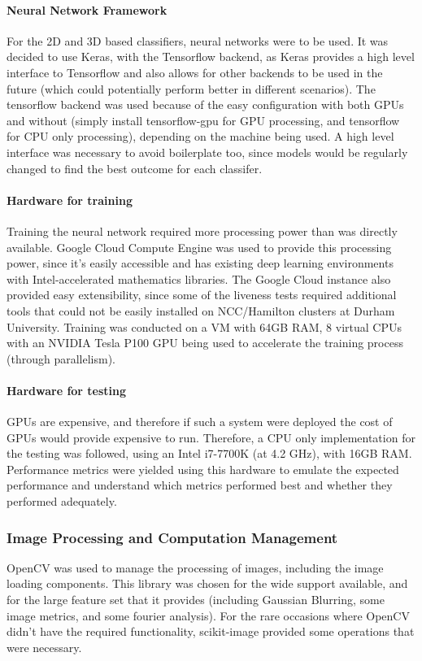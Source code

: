 \documentclass[10pt,a4paper]{article}
\begin{document}
            \paragraph{Neural Network Framework} 
            For the 2D and 3D based classifiers, neural networks were to be used. It was decided to use Keras, with the Tensorflow backend, as Keras provides a high level interface to Tensorflow
            and also allows for other backends to be used in the future (which could potentially perform better in different scenarios). The tensorflow backend was used because of the easy configuration
            with both GPUs and without (simply install tensorflow-gpu for GPU processing, and tensorflow for CPU only processing), depending on the machine being used. A high level interface was necessary
            to avoid boilerplate too, since models would be regularly changed to find the best outcome for each classifer.

            \paragraph{Hardware for training}
            Training the neural network required more processing power than was directly available. Google Cloud Compute Engine was used to provide this processing power, since it's easily accessible and has existing
            deep learning environments with Intel-accelerated mathematics libraries. The Google Cloud instance also provided easy extensibility, since some of the liveness tests required additional tools that could not be easily installed
            on NCC/Hamilton clusters at Durham University. Training was conducted on a VM with 64GB RAM, 8 virtual CPUs with an NVIDIA Tesla P100 GPU being used to accelerate the training process (through parallelism).

            \paragraph{Hardware for testing}
            GPUs are expensive, and therefore if such a system were deployed the cost of GPUs would provide expensive to run. Therefore, a CPU only implementation for the testing was followed, using an Intel i7-7700K (at 4.2 GHz), with
            16GB RAM. Performance metrics were yielded using this hardware to emulate the expected performance and understand which metrics performed best and whether they performed adequately.

        \subsubsection{Image Processing and Computation Management}
            OpenCV was used to manage the processing of images, including the image loading components. This library was chosen for the wide support available, and for the large feature set that it provides (including Gaussian Blurring, some image metrics, and some fourier analysis).
            For the rare occasions where OpenCV didn't have the required functionality, scikit-image provided some operations that were necessary.
            
\end{document}
